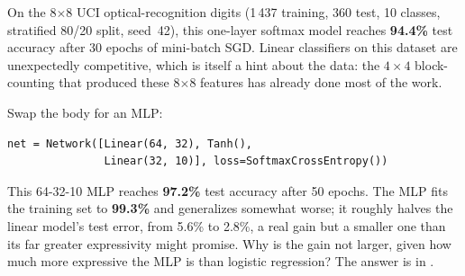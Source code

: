 On the 8$\times$8 UCI optical-recognition digits
(1\,437 training, 360 test, 10 classes, stratified 80/20 split,
seed~42), this one-layer softmax model reaches \textbf{94.4\%} test
accuracy after 30 epochs of mini-batch SGD. Linear classifiers on this
dataset are unexpectedly competitive, which is itself a hint about the
data: the $4 \times 4$ block-counting that produced these 8$\times$8
features has already done most of the work.

Swap the body for an MLP:
\begin{lstlisting}
net = Network([Linear(64, 32), Tanh(),
               Linear(32, 10)], loss=SoftmaxCrossEntropy())
\end{lstlisting}
This 64-32-10 MLP reaches \textbf{97.2\%} test accuracy after 50 epochs.
The MLP fits the training set to \textbf{99.3\%} and generalizes
somewhat worse; it roughly halves the linear model's test error, from
5.6\% to 2.8\%, a real gain but a smaller one than its far greater
expressivity might promise. Why is the gain not larger, given how much
more expressive the MLP is than logistic regression? The answer is in
.
